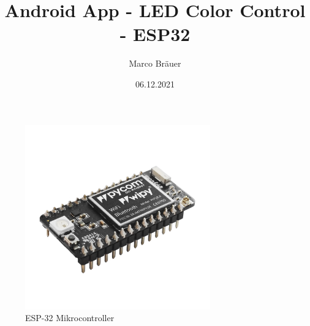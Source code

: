 \title{Android App - LED Color Control - ESP32}
\author{Marco Bräuer}
\date{06.12.2021}
\maketitle
\begin{figure}[h]
\begin{center}
\includegraphics[width=8cm]{img/esp32.png}
\caption{ESP-32 Mikrocontroller}
\label{mein_logo}
\end{center}
\end{figure}

